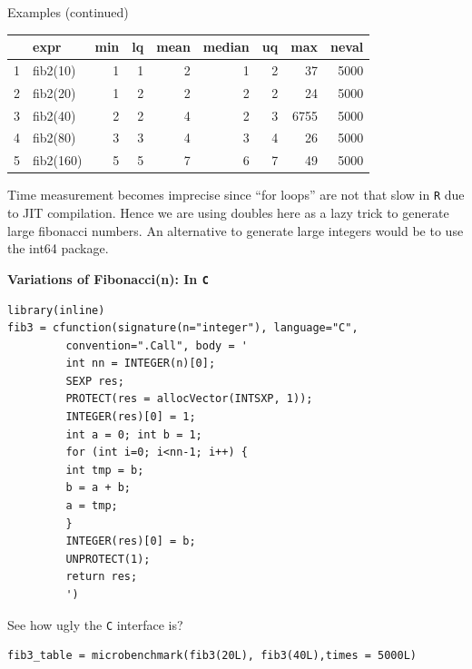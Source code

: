 \documentclass[11pt,compress,t,notes=noshow, xcolor=table]{beamer}
\begin{document}
\begin{vbframe}{Examples (continued)}
\begin{scriptsize}
\begin{table}[ht]
  \centering
  \begingroup\fontsize{8pt}{9pt}\selectfont
  \begin{tabular}{rlrrrrrrr}
    \toprule
   & expr & min & lq & mean & median & uq & max & neval \\ 
    \midrule
  1 & fib2(10) & 1 & 1 & 2 & 1 & 2 & 37 & 5000 \\ 
    2 & fib2(20) & 1 & 2 & 2 & 2 & 2 & 24 & 5000 \\ 
    3 & fib2(40) & 2 & 2 & 4 & 2 & 3 & 6755 & 5000 \\ 
    4 & fib2(80) & 3 & 3 & 4 & 3 & 4 & 26 & 5000 \\ 
    5 & fib2(160) & 5 & 5 & 7 & 6 & 7 & 49 & 5000 \\ 
     \bottomrule
  \end{tabular}
  \endgroup
  \end{table}
\end{scriptsize}
Time measurement becomes imprecise since ``for loops'' are not that slow in \texttt{R} due to JIT compilation. Hence we are using doubles here as a lazy trick to generate large fibonacci numbers. An alternative to generate large integers would be to use the int64 package.\\





\framebreak

\textbf{Variations of Fibonacci(n): In \texttt{C}}

\begin{scriptsize}
\begin{verbatim}
library(inline)
fib3 = cfunction(signature(n="integer"), language="C",
         convention=".Call", body = '
         int nn = INTEGER(n)[0];
         SEXP res;
         PROTECT(res = allocVector(INTSXP, 1));
         INTEGER(res)[0] = 1;
         int a = 0; int b = 1;
         for (int i=0; i<nn-1; i++) {
         int tmp = b;
         b = a + b;
         a = tmp;
         }
         INTEGER(res)[0] = b;
         UNPROTECT(1);
         return res;
         ')
\end{verbatim}
\end{scriptsize}
See how ugly the \texttt{C} interface is?
\framebreak

\begin{scriptsize}
\begin{verbatim}
fib3_table = microbenchmark(fib3(20L), fib3(40L),times = 5000L)


\end{verbatim}
\end{scriptsize}
\end{vbframe}
\end{document}
